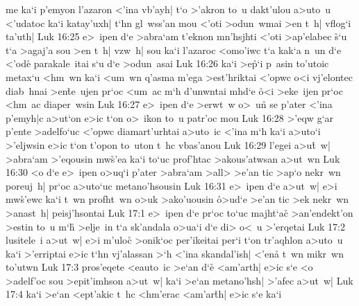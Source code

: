 me
ka`i
p'emyon
l'azaron
<'ina
vb'ayh|
t`o
>'akron
to~u
dakt'ulou
a>uto~u
<'udatoc
ka`i
katay'uxh|
t`hn
gl~wss'an
mou
<'oti
>odun~wmai
>en
t~h|
vflog`i
ta'uth|\bibvsend
\vs Luk 16:25
e>~ipen
d`e
>abra`am
t'eknon
mn'hsjhti
<'oti
>ap'elabec
\r{s}`u
t`a
>agaj'a
sou
>en
t~h|
vzw~h|
sou
ka`i
l'azaroc
<omo'iwc
t`a
kak`a
n~un
d`e
<'od\r{e}
parakale~itai
s`u
d`e
>odun~asai\bibvsend
\vs Luk 16:26
ka`i
>e\r{p}`i
p~asin
to'utoic
metax`u
<hm~wn
ka`i
<um~wn
q'asma
m'ega
>est'hriktai
<'opwc
o<i
vj'elontec
diab~hnai
>en\r{t}e~ujen
pr`oc
<um~ac
m`h
d'unwntai
mhd`e
\r{o}<i
>eke~ijen
pr`oc
<hm~ac
diaper~wsin\bibvsend
\vs Luk 16:27
e>~ipen
d`e
>erwt~w
o>~un\r{}
se
p'ater
<'ina
p'emyh|c
a>ut`on
e>ic
t`on
o>~ikon
to~u
patr'oc
mou\bibvsend
\vs Luk 16:28
>'eqw
g`ar
p'ente
>adelfo`uc
<'opwc
diamart'urhtai
a>uto~ic
<'ina
m`h
ka`i
a>uto`i
>'eljwsin
e>ic
t`on
t'opon
to~uton
t~hc
vbas'anou\bibvsend
\vs Luk 16:29
l'egei
a>u\r{t}~w|
>abra`am
>'eqousin
mw\r{s}'ea
ka`i
to`uc
prof'htac
>akous'atwsan
a>ut~wn\bibvsend
\vs Luk 16:30
<o
d`e
e>~ipen
o>uq`i
p'ater
>abra`am
>all>
>e'an
tic
>ap`o
nekr~wn
poreuj~h|
pr`oc
a>uto`uc
metano'hsousin\bibvsend
\vs Luk 16:31
e>~ipen
d`e
a>ut~w|
e>i
mw\r{s}'ewc
ka`i
t~wn
profht~wn
o>uk
>ako'uousin
\r{o}>ud`e
>e'an
tic
>ek
nekr~wn
>anast~h|
peisj'hsontai\bibvsend
\vs Luk 17:1
e>~ipen
d`e
pr`oc
to`uc
majht`a\r{c}
>an'endekt'on
>estin
to~u
m`h\r{}
>elje~in
t`a
sk'andala
o>ua`i
d`e
di>
o<~u
>'erqetai\bibvsend
\vs Luk 17:2
lusitele~i
a>ut~w|
e>i
m'uloc\r{}
>onik`oc
per'ikeitai
per`i
t`on
tr'aqhlon
a>uto~u
ka`i
>'erriptai
e>ic
t`hn
vj'alassan
>`h
<'ina
skandal'ish|
<'ena\r{}
t~wn
mikr~wn
to'utwn\bibvsend
\vs Luk 17:3
pros'eqete
<eauto~ic
>e`an
d`e\r{}
<am'arth|
e>ic
s`e
<o
>adelf'oc
sou
>epit'imhson
a>ut~w|
ka`i
>e`an
metano'hsh|
>'afec
a>ut~w|\bibvsend
\vs Luk 17:4
ka`i
>e`an
<ept'akic
t~hc
<hm'erac
<am'ar\r{t}h|
e>ic
s`e
ka`i
